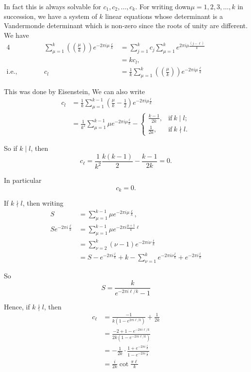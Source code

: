 In fact this is always solvable for $c_1, c_2, \ldots, c_k$. For
writing down\pageoriginale $\mu = 1, 2, 3, \ldots , k$ in succession,
we have a system of $k$ linear equations whose determinant is a
Vandermonde determinant which is non-zero since the roots of unity are
different. We have
\begin{alignat*}{4}
  && \sum^k_{\mu=1} \left( \left(\frac{\mu}{k} \right)\right) e^{-2 \pi
  i \mu \frac{\ell}{k}}&  =\sum^k_{j=1} c_j \sum^k_{\mu=1} e^{2 \pi i
    \mu \frac{(j-\ell)}{k}}\\
  &&& =kc_l,\\
  \text{i.e.,}&\hspace{1cm}& c_l & = \frac{1}{k} \sum^k_{\mu=1} \left(
  \left(\frac{\mu}{k} \right)\right) e^{-2 \pi i \mu \frac{\ell}{k}}\hspace{3cm}
\end{alignat*}

This was done by Eisenstein, We can also write
\begin{align*}
  c_l & = \frac{1}{k} \sum^{k-1}_{\mu=1} \left( \frac{\mu}{k} -
  \frac{1}{2}\right) e^{-2\pi i \mu \frac{l}{k}}\\
  & = \frac{1}{k^2} \sum^{k-1}_{\mu=1} \mu e^{-2 \pi i \mu
    \frac{l}{k}} - 
  \begin{cases}
    \frac{k-1}{2k}, & \text{if}~ k\mid l;\\
    \frac{1}{2k}, & \text{if} ~ k \nmid l.
  \end{cases}
\end{align*}

So if $k \mid l$, then 
$$
c_\ell = \frac{1}{k^2} \frac{k(k-1)}{2} - \frac{k-1}{2k} =0.
$$

In particular 
$$
c_k =0.
$$

If $k \nmid l$, then writing 
\begin{align*}
  S & = \sum^{k-1}_{\mu=1} \mu e^{-2 \pi i \mu
    \frac{\ell}{k}},\\
  S e^{-2 \pi i \frac{\ell}{k}} & = \sum^{k-1}_{\mu=1} \mu e^{-2 \pi i
    \frac{\mu+1}{k} \ell}\\
  & = \sum^k_{\nu=2} (\nu-1) e^{- 2 \pi i \nu \frac{\ell}{k}}\\
  & = S- e^{-2 \pi i \frac{l}{k}} + k - \sum^k_{\nu=1} e^{-2 \pi i
    \nu \frac{l}{k}} + e^{-2 \pi i \frac{l}{k}}
\end{align*}

So\pageoriginale 
$$
S= \frac{k}{e^{- 2 \pi i \ell/k}-1}
$$

Hence, if $k \nmid l$, then
\begin{align*}
  c_\ell & = \frac{-1}{k(1-e^{2 \pi i \ell/k})} + \frac{1}{2k}\\
  & = \frac{-2+1 -e^{-2 \pi i \ell/k}}{2k(1- e^{-2 \pi i \ell/k})}\\
  & = - \frac{1}{2k} \cdot \frac{1+ e^{-2\pi i \frac{\ell}{k}}}{1-
    e^{-2 \pi i \frac{\ell}{k}}}\\
  & = \frac{i}{2k} \cot \frac{\pi \ell}{k}
\end{align*}

